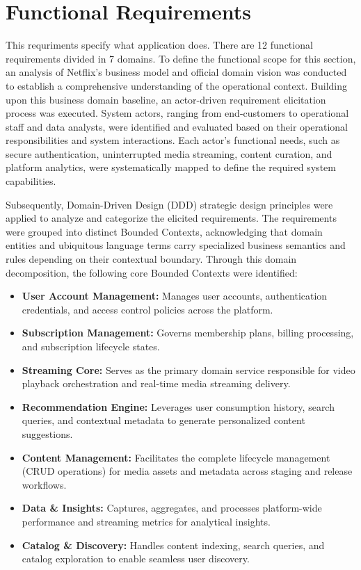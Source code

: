 \documentclass{article}
\begin{document}
\FloatBarrier
\section{Functional Requirements}
This requriments specify what application does. There are 12 functional requirements divided in 7 domains.
To define the functional scope for this section, an analysis of Netflix's business model and official domain vision was conducted to establish a comprehensive understanding of the operational context. Building upon this business domain baseline, an actor-driven requirement elicitation process was executed. System actors, ranging from end-customers to operational staff and data analysts, were identified and evaluated based on their operational responsibilities and system interactions. Each actor's functional needs, such as secure authentication, uninterrupted media streaming, content curation, and platform analytics, were systematically mapped to define the required system capabilities.

Subsequently, Domain-Driven Design (DDD) strategic design principles were applied to analyze and categorize the elicited requirements. The requirements were grouped into distinct Bounded Contexts, acknowledging that domain entities and ubiquitous language terms carry specialized business semantics and rules depending on their contextual boundary. Through this domain decomposition, the following core Bounded Contexts were identified:

\begin{itemize}
    \item \textbf{User Account Management:} Manages user accounts, authentication credentials, and access control policies across the platform.

    \item \textbf{Subscription Management:} Governs membership plans, billing processing, and subscription lifecycle states.

    \item \textbf{Streaming Core:} Serves as the primary domain service responsible for video playback orchestration and real-time media streaming delivery.

    \item \textbf{Recommendation Engine:} Leverages user consumption history, search queries, and contextual metadata to generate personalized content suggestions.

    \item \textbf{Content Management:} Facilitates the complete lifecycle management (CRUD operations) for media assets and metadata across staging and release workflows.

    \item \textbf{Data \& Insights:} Captures, aggregates, and processes platform-wide performance and streaming metrics for analytical insights.

    \item \textbf{Catalog \& Discovery:} Handles content indexing, search queries, and catalog exploration to enable seamless user discovery.
\end{itemize}
\end{document}
